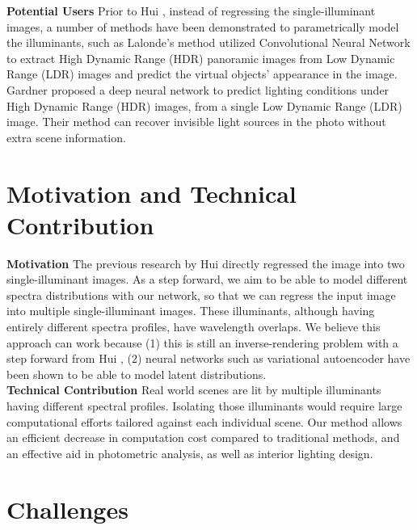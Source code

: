 \documentclass[final]{cvpr}
\begin{document}
\textbf{Potential Users } Prior to Hui \etal\cite{hui2019learning}, instead of regressing the single-illuminant images, a number of methods have been demonstrated to parametrically model the illuminants, such as Lalonde’s method \cite{holdgeoffroy2018deep} utilized Convolutional Neural Network to extract High Dynamic Range (HDR) panoramic images from Low Dynamic Range (LDR) images and predict the virtual objects’ appearance in the image. Gardner \etal\cite{gardner2017learning} proposed a deep neural network to predict lighting conditions under High Dynamic Range (HDR) images, from a single Low Dynamic Range (LDR) image. Their method can recover invisible light sources in the photo without extra scene information.\\





\section{Motivation and Technical Contribution}
\label{sec:motivation}
\textbf{Motivation} The previous research by Hui \etal\cite{hui2019learning} directly regressed the image into two single-illuminant images. As a step forward, we aim to be able to model different spectra distributions with our network, so that we can regress the input image into multiple single-illuminant images. These illuminants, although having entirely different spectra profiles, have wavelength overlaps. We believe this approach can work because (1) this is still an inverse-rendering problem with a step forward from Hui \etal\cite{hui2019learning}, (2) neural networks such as variational autoencoder have been shown to be able to model latent distributions.\\

\textbf{Technical Contribution} Real world scenes are lit by multiple illuminants having different spectral profiles. Isolating those illuminants would require large computational efforts tailored against each individual scene. Our method allows an efficient decrease in computation cost compared to traditional methods, and an effective aid in photometric analysis, as well as interior lighting design.

\section{Challenges}
\label{sec:challenges}
\end{document}
